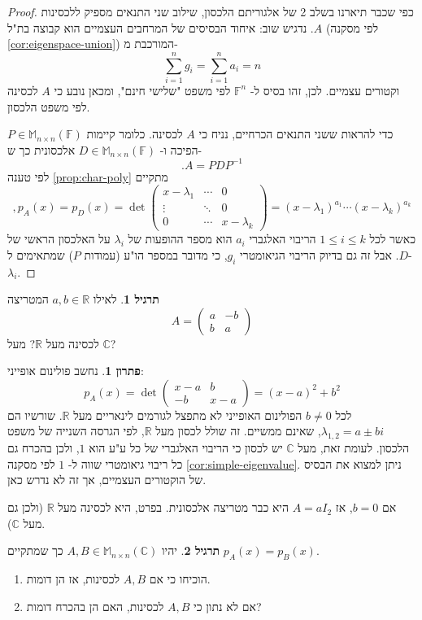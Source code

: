 \documentclass[12pt]{report}
\theoremstyle{plain}
\theoremstyle{definition}
\newtheorem{exercise}{תרגיל}[chapter]
\newtheorem*{solution}{פתרון}
\newcommand{\R}{\mathbb{R}}
\newcommand{\C}{\mathbb{C}}
\newcommand{\F}{\mathbb{F}}
\newcommand{\M}{\mathbb{M}}
\newcommand{\0}{\mathbf{0}}
\begin{document}
\begin{proof}
כפי שכבר תיארנו בשלב 2 של אלגוריתם הלכסון, שילוב שני התנאים מספיק ללכסינות 
$A$.
נדגיש שוב: איחוד הבסיסים של המרחבים העצמיים הוא קבוצה בת"ל 
(לפי מסקנה
\ref{cor:eigenspace-union})
המורכבת מ-
$$
\sum_{i=1}^ng_i=\sum_{i=1}^na_i=n
$$
וקטורים עצמיים. לכן, זהו בסיס ל-
$\F^n$
לפי משפט "שלישי חינם", ומכאן נובע כי 
$A$
לכסינה לפי משפט הלכסון.


כדי להראות ששני התנאים הכרחיים, נניח כי
$A$
לכסינה. כלומר קיימות
$P\in\M_{n\times n}(\F)$
הפיכה ו-
$D\in\M_{n\times n}(\F)$
אלכסונית כך ש-
$$
.A=PDP^{-1}
$$
לפי טענה
\ref{prop:char-poly}
מתקיים
$$
,p_A(x)=p_D(x)=\det\begin{pmatrix}
x-\lambda_1 & \cdots & 0 \\
\vdots & \ddots & 0 \\
0 & \cdots & x-\lambda_k
\end{pmatrix}=(x-\lambda_1)^{a_1}\cdots(x-\lambda_k)^{a_k}
$$
כאשר
לכל
$1\leq i\leq k$
הריבוי האלגברי
$a_i$
הוא מספר ההופעות של 
$\lambda_i$
על האלכסון הראשי של 
$D$.
אבל זה גם בדיוק הריבוי הגיאומטרי
$g_i$,
כי מדובר במספר הו"ע (עמודות 
$P$) 
שמתאימים ל-
$\lambda_i$.

\end{proof}

\begin{exercise}
לאילו 
$a,b\in\R$
המטריצה
$$
A=\begin{pmatrix}
a & -b \\
b & a
\end{pmatrix}
$$
לכסינה מעל
$\R$?
מעל
$\C$?
\end{exercise}

\begin{solution}
נחשב פולינום אופייני:
$$
p_A(x)=\det\begin{pmatrix}
x-a & b \\
-b & x-a
\end{pmatrix}=(x-a)^2+b^2
$$
לכל
$b\neq 0$
הפולינום האופייני לא מתפצל לגורמים לינאריים מעל
$\R$.
שורשיו הם
$\lambda_{1,2}=a\pm bi$,
שאינם ממשיים. זה שולל לכסון מעל
$\R$,
לפי הגרסה השנייה של משפט הלכסון. לעומת זאת, מעל
$\C$
יש לכסון כי הריבוי האלגברי של כל ע"ע הוא 
$1$,
ולכן בהכרח גם כל ריבוי גיאומטרי שווה ל-
$1$ 
לפי מסקנה
\ref{cor:simple-eigenvalue}.
ניתן למצוא את הבסיס של הוקטורים העצמיים, אך זה לא נדרש כאן.

אם 
$b=0$,
אז 
$A=aI_2$
היא כבר מטריצה אלכסונית. בפרט, היא לכסינה מעל 
$\R$
(ולכן גם מעל
$\C$).
\end{solution}

\begin{exercise}\label{exer:not-similar}
יהיו
$A,B\in\M_{n\times n}(\C)$
כך שמתקיים
$p_A(x)=p_B(x)$.
\begin{enumerate}[label=\alph*.]
\item 
הוכיחו כי אם
$A,B$
לכסינות, אז הן דומות.



\item 
אם לא נתון כי
$A,B$
לכסינות, האם הן בהכרח דומות?


\end{enumerate}
\end{exercise}
\end{document}
